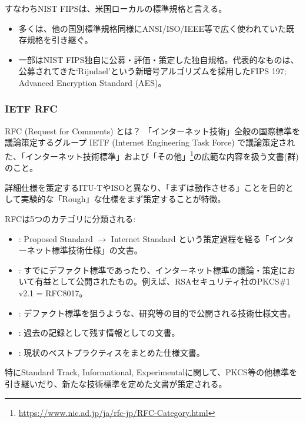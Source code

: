 \documentclass[12pt,dvipdfmx]{beamer}
\begin{document}
\begin{frame}
すなわちNIST FIPSは、米国ローカルの標準規格と言える。

\begin{itemize}
\item 多くは、他の国別標準規格同様にANSI/ISO/IEEE等で広く使われていた既存規格を引き継ぐ。
\item 一部はNIST FIPS独自に公募・評価・策定した独自規格。代表的なものは、公募されてきた`Rijndael'という新暗号アルゴリズムを採用したFIPS 197; Advanced Encryption Standard (AES)。
\end{itemize}
\end{frame}

\begin{frame}
\frametitle{IETF RFC}
\begin{block}{RFC (Request for Comments) とは？}
「インターネット技術」全般の国際標準を議論策定するグループ IETF (Internet Engineering Task Force) で議論策定された、「インターネット技術標準」および「その他」\footnote[frame]{\scriptsize \url{https://www.nic.ad.jp/ja/rfc-jp/RFC-Category.html}}の広範な内容を扱う文書(群)のこと。
\end{block}

詳細仕様を策定するITU-TやISOと異なり、「まずは動作させる」ことを目的として実験的な「Rough」な仕様をまず策定することが特徴。
\end{frame}

\begin{frame}
RFCは5つのカテゴリに分類される:
\begin{itemize}
 \item {}: Proposed Standard $\rightarrow$ Internet Standard という策定過程を経る「インターネット標準技術仕様」の文書。
 \item {}: すでにデファクト標準であったり、インターネット標準の議論・策定において有益として公開されたもの。例えば、RSAセキュリティ社のPKCS\#1 v2.1 = RFC8017。
 \item {}: デファクト標準を狙うような、研究等の目的で公開される技術仕様文書。
 \item {}: 過去の記録として残す情報としての文書。
 \item {}: 現状のベストプラクティスをまとめた仕様文書。
\end{itemize}

特にStandard Track, Informational, Experimentalに関して、PKCS等の他標準を引き継いだり、新たな技術標準を定めた文書が策定される。
\end{frame}
\end{document}
